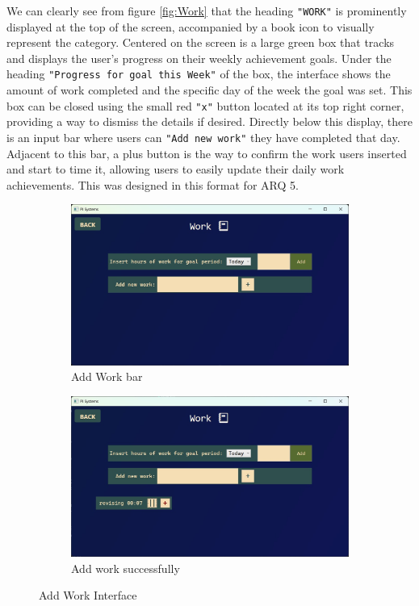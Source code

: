 \documentclass[12pt]{article}
\begin{document}
We can clearly see from figure \ref{fig:Work} that the heading \texttt{"WORK"} is
prominently displayed at the top of the screen, accompanied by a book icon to
visually represent the category. Centered on the screen is a large green box that
tracks and displays the user's progress on their weekly achievement goals. Under
the heading \texttt{"Progress for goal this Week"} of the box, the interface
shows the amount of work completed and the specific day of the week the goal was
set. This box can be closed using the small red \texttt{"x"} button located at
its top right corner, providing a way to dismiss the details if desired. Directly
below this display, there is an input bar where users can \texttt{"Add new work"}
they have completed that day. Adjacent to this bar, a plus button is the way to
confirm the work users inserted and start to time it, allowing users to easily
update their daily work achievements. This was designed in this format for ARQ 5.\par

\begin{figure}[!ht]
  \centering
  \begin{subfigure}{0.4\linewidth}
    \includegraphics[width=\linewidth]{Add Work}
    \caption{Add Work bar}
    \label{fig:Add_Work}
  \end{subfigure}
  \hfill
  \begin{subfigure}{0.4\linewidth}
    \includegraphics[width=\linewidth]{Add Work 2}
    \caption{Add work successfully}
    \label{fig:Add_Work_2}
  \end{subfigure}
  \caption{Add Work Interface}
  \label{fig:Work_Interface}
\end{figure}
\end{document}

